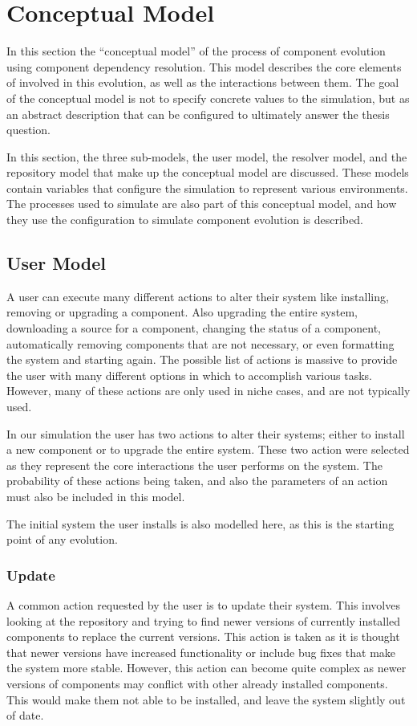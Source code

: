 \section{Conceptual Model}
In this section the ``conceptual model'' of the process of component evolution using component dependency resolution.
This model describes the core elements of involved in this evolution, as well as the interactions between them.
The goal of the conceptual model is not to specify concrete values to the simulation, 
but as an abstract description that can be configured to ultimately answer the thesis question.

In this section, the three sub-models, the user model, the resolver model, and the repository model that make up the conceptual model are discussed.
These models contain variables that configure the simulation to represent various environments.
The processes used to simulate are also part of this conceptual model, and how they use the configuration to simulate component evolution is described. 

\subsection{User Model}
A user can execute many different actions to alter their system like installing, removing or upgrading a component.
Also upgrading the entire system, downloading a source for a component, changing the status of a component, 
automatically removing components that are not necessary, or even formatting the system and starting again.
The possible list of actions is massive to provide the user with many different options in which to accomplish various tasks.
However, many of these actions are only used in niche cases, and are not typically used.

In our simulation the user has two actions to alter their systems; either to install a new component or to upgrade the entire system.
These two action were selected as they represent the core interactions the user performs on the system.
The probability of these actions being taken, and also the parameters of an action must also be included in this model.

The initial system the user installs is also modelled here, as this is the starting point of any evolution.

\subsubsection{Update}
A common action requested by the user is to update their system.
This involves looking at the repository and trying to find newer versions of currently installed components to replace the current versions.
This action is taken as it is thought that newer versions have increased functionality or include bug fixes that make the system more stable.
However, this action can become quite complex as newer versions of components may conflict with other already installed components.
This would make them not able to be installed, and leave the system slightly out of date.

